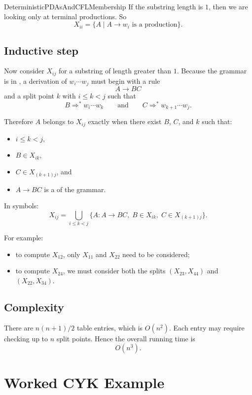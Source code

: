 \documentclass[hidelinks]{article}
\begin{document}
\begin{smodule}[title={Deterministic PDAs and CFL Membership}]{DeterministicPDAsAndCFLMembership}
If the substring length is $1$, then we are looking only at terminal productions.
So
\[
X_{ii} = \{A \mid A \to w_i \text{ is a production}\}.
\]

\subsection{Inductive step}

Now consider $X_{ij}$ for a substring of length greater than $1$.
Because the grammar is in , a derivation of $w_i\cdots w_j$ must begin with a rule
\[
A \to BC
\]
and a split point $k$ with $i \leq k < j$ such that
\[
B \Rightarrow^* w_i\cdots w_k
\qquad \text{and} \qquad
C \Rightarrow^* w_{k+1}\cdots w_j.
\]

Therefore $A$ belongs to $X_{ij}$ exactly when there exist $B$, $C$, and $k$ such that:
\begin{itemize}
    \item $i \leq k < j$,
    \item $B \in X_{ik}$,
    \item $C \in X_{(k+1)j}$, and
    \item $A \to BC$ is a  of the grammar.
\end{itemize}

In symbols:
\[
X_{ij}
=
\bigcup_{i \leq k < j}
\{A : A \to BC,\; B \in X_{ik},\; C \in X_{(k+1)j}\}.
\]

For example:
\begin{itemize}
    \item to compute $X_{12}$, only $X_{11}$ and $X_{22}$ need to be considered;
    \item to compute $X_{24}$, we must consider both the splits $(X_{23},X_{44})$ and $(X_{22},X_{34})$.
\end{itemize}

\subsection{Complexity}

There are $n(n+1)/2$ table entries, which is $O(n^2)$.
Each entry may require checking up to $n$ split points.
Hence the overall running time is
\[
O(n^3).
\]

\section{Worked CYK Example}


\end{smodule}
\end{document}
